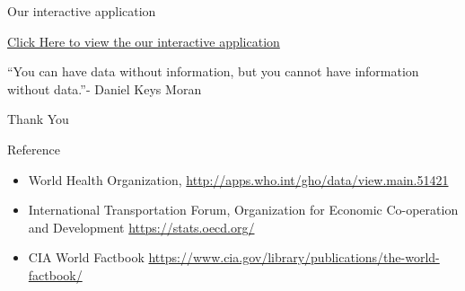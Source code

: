 \documentclass[ignorenonframetext,]{beamer}
\providecommand{\tightlist}{%
  \setlength{\itemsep}{0pt}\setlength{\parskip}{0pt}}
\begin{document}
\begin{frame}{Our interactive application}

\href{https://pelzma.shinyapps.io/interactive_plot/}{Click Here to view
the our interactive application}

\end{frame}

\begin{frame}{}

``You can have data without information, but you cannot have information
without data.''- Daniel Keys Moran

Thank You

\end{frame}

\begin{frame}{Reference}

\begin{itemize}
\tightlist
\item
  World Health Organization,
  \url{http://apps.who.int/gho/data/view.main.51421}\\
\item
  International Transportation Forum, Organization for Economic
  Co-operation and Development \url{https://stats.oecd.org/}
\item
  CIA World Factbook
  \url{https://www.cia.gov/library/publications/the-world-factbook/}
\end{itemize}

\end{frame}
\end{document}

